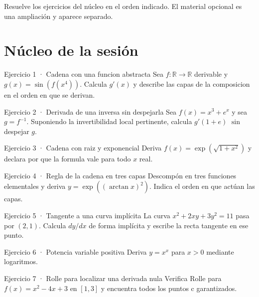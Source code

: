 \documentclass[10pt,a4paper,oneside,openany]{book}
\begin{document}
Resuelve los ejercicios del núcleo en el orden indicado. El material opcional es una ampliación y aparece separado.
\section*{Núcleo de la sesión}
\begin{PSevenExerciseFixed}{Ejercicio 1 · Cadena con una funcion abstracta}
Sea \(f:\mathbb{R}\to \mathbb{R}\) derivable y \(g(x)=\sin(f(x^{4}))\). Calcula \(g'(x)\) y describe las capas de la composicion en el orden en que se derivan.
\end{PSevenExerciseFixed}
\begin{PSevenExerciseFixed}{Ejercicio 2 · Derivada de una inversa sin despejarla}
Sea \(f(x)=x^{3}+e^x\) y sea \(g=f^{-1}\). Suponiendo la invertibilidad local pertinente, calcula \(g'(1+e)\) \(\sin\) despejar \(g\).
\end{PSevenExerciseFixed}
\begin{PSevenExerciseFixed}{Ejercicio 3 · Cadena con raiz y exponencial}
Deriva \(f(x)=\exp(\sqrt{1+x^{2}})\) y declara por que la formula vale para todo \(x\) real.
\end{PSevenExerciseFixed}
\begin{PSevenExerciseFixed}{Ejercicio 4 · Regla de la cadena en tres capas}
Descompón en tres funciones elementales y deriva \(y=\exp((\arctan x)^2)\). Indica el orden en que actúan las capas.
\end{PSevenExerciseFixed}
\begin{PSevenExerciseFixed}{Ejercicio 5 · Tangente a una curva implícita}
La curva \(x^2+2xy+3y^2=11\) pasa por \((2,1)\). Calcula \(dy/dx\) de forma implícita y escribe la recta tangente en ese punto.
\end{PSevenExerciseFixed}
\begin{PSevenExerciseFixed}{Ejercicio 6 · Potencia variable positiva}
Deriva \(y=x^x\) para \(x>0\) mediante logaritmos.
\end{PSevenExerciseFixed}
\begin{PSevenExerciseFixed}{Ejercicio 7 · Rolle para localizar una derivada nula}
Verifica Rolle para \(f(x)=x^{2}-4x+3\) en \([1,3]\) y encuentra todos los puntos c garantizados.
\end{PSevenExerciseFixed}
\end{document}
